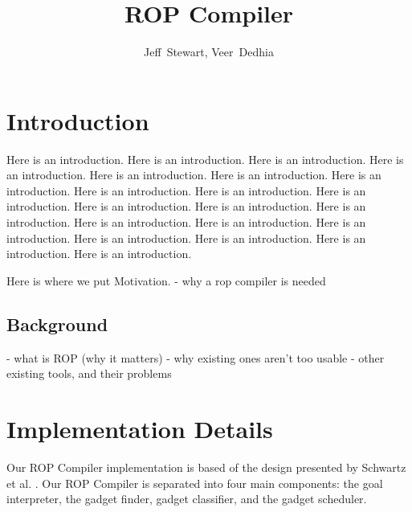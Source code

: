 \documentclass[journal]{IEEEtran}
\begin{document}
%
\title{ROP Compiler}

\author{Jeff~Stewart,
        Veer~Dedhia}



\maketitle

\section{Introduction}
Here is an introduction. Here is an introduction. Here is an introduction. Here is an introduction. Here is an introduction.
Here is an introduction. Here is an introduction. Here is an introduction. Here is an introduction. Here is an introduction.
Here is an introduction. Here is an introduction. Here is an introduction. Here is an introduction. Here is an introduction.
Here is an introduction. Here is an introduction. Here is an introduction. Here is an introduction. Here is an introduction.

Here is where we put Motivation.
  - why a rop compiler is needed

\subsection{Background}
  - what is ROP (why it matters)
  - why existing ones aren't too usable
      - other existing tools, and their problems

\section{Implementation Details}
Our ROP Compiler implementation is based of the design presented by Schwartz et al. \cite{schwartz2011q}.
Our ROP Compiler is separated into four main components: the goal interpreter, the gadget finder, gadget classifier, and the gadget scheduler.
\end{document}

